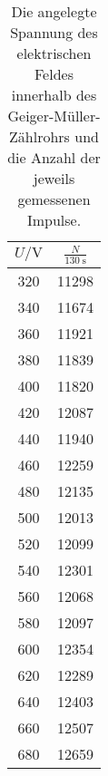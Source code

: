 \begin{table}\caption{Die angelegte Spannung des elektrischen Feldes innerhalb des Geiger-Müller-Zählrohrs und die Anzahl der jeweils gemessenen Impulse.}
\label{taba}
\centering
{}
\begin{tabular}{c c} 
\toprule
{$U / \si{\volt}$} & {$\frac{N}{\SI{130}{\second}}$}\\
\midrule
320 & 11298\\
340 & 11674\\
360 & 11921\\
380 & 11839\\
400 & 11820\\
420 & 12087\\
440 & 11940\\
460 & 12259\\
480 & 12135\\
500 & 12013\\
520 & 12099\\
540 & 12301\\
560 & 12068\\
580 & 12097\\
600 & 12354\\
620 & 12289\\
640 & 12403\\
660 & 12507\\
680 & 12659\\
\bottomrule
\end{tabular}\end{table}